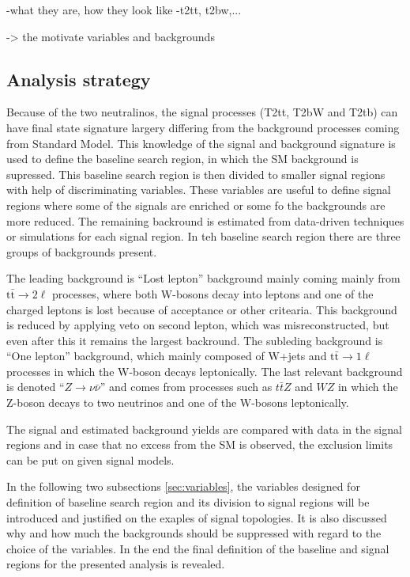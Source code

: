 -what they are, how they look like
-t2tt, t2bw,...

-> the motivate variables and backgrounds



\subsection{Analysis strategy}

Because of the two neutralinos, the signal processes (T2tt, T2bW and T2tb)  can have final state signature largery differing from the background processes coming from Standard Model. This knowledge of the signal and background signature is used to define the baseline search region, in which the SM background is supressed. This baseline search region is then divided to smaller signal regions with help of discriminating variables. These variables are useful to define signal regions where some of the signals are enriched or some fo the backgrounds are more reduced. The remaining backround is estimated from data-driven techniques or simulations for each signal region. In teh baseline search region there are three groups of backgrounds present. 

The leading background is ``Lost lepton'' background mainly coming mainly from $\mathrm{t\bar{t}} \to 2 \ell$ processes, where both W-bosons decay into leptons and one of the charged leptons is lost because of acceptance or other critearia. This background is reduced by applying veto on second lepton, which was misreconstructed, but even after this it remains the largest backround. The subleding background is ``One lepton'' background, which mainly composed of W+jets and $\mathrm{t\bar{t}} \to 1 \ell$ processes in which the W-boson decays leptonically. The last relevant background is denoted ``$Z \to \nu \bar{\nu}$'' and comes from processes such as $t\bar{t}Z$ and $WZ$ in which the Z-boson decays to two neutrinos and one of the W-bosons leptonically.  

The signal and estimated background yields are compared with data in the signal regions and in case that no excess from the SM is observed, the exclusion limits can be put on given signal models.

In the following two subsections \ref{sec:variables}, the variables designed for definition of baseline search region and its division to signal regions will be introduced and justified on the exaples of signal topologies.  It is also discussed why and how much the backgrounds should be suppressed with regard to the choice of the variables. In the end the final definition of the baseline and signal regions for the presented analysis is revealed.

